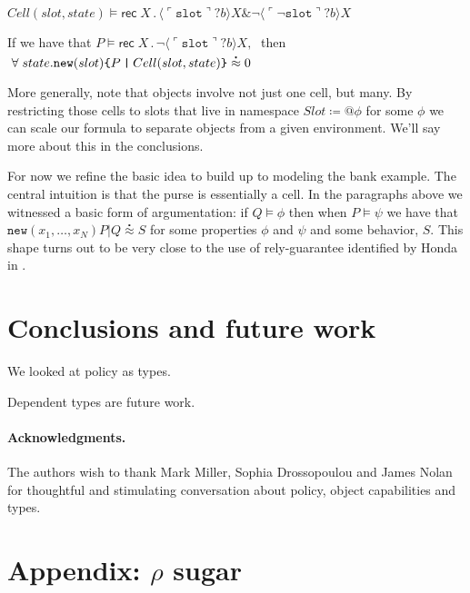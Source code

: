 \documentclass[]{amsart}
\newcommand{\lpquote}{\ulcorner}
\newcommand{\rpquote}{\urcorner}
\newcommand{\id}[1]{\texttt{#1}}
\newcommand{\juxtap}{\mathbin{\id{|}}}
\newcommand{\binpar}[2]{#1 \juxtap #2}
\newcommand{\defneqls}{\coloneqq}
\newcommand{\wbbisim}{\stackrel{\centerdot}{\approx}} %
\newcommand{\pquotep}[1]{\lpquote #1 \rpquote}
\newcommand{\pprefix}[3]{\langle #1 ? #2 \rangle #3}
\newcommand{\pgfp}[2]{\textsf{rec} \; #1 \mathbin{.} #2}
\theoremstyle{definition}
\theoremstyle{remark}
\numberwithin{equation}{subsection}
\begin{document}
$Cell (slot, state) \models 
\pgfp{X}{\pprefix{\pquotep{\texttt{slot}}}{b}{X} \& 
\neg \pprefix{\pquotep{\neg \texttt{slot}}}{b}{X}}$

If we have that $P \models \pgfp{X}{\neg
  \pprefix{\pquotep{\texttt{slot}}}{b}{X}}, \;$ then
$\; \forall \; state . \mbox{\tt new}(slot)\mbox{\tt \{}
\binpar{P}{Cell(slot, state)} \mbox{\tt \}}\wbbisim 0$

More generally, note that objects involve not just one cell, but
many. By restricting those cells to slots that live in namespace $Slot
\defneqls {@}\phi$ for some $\phi$ we can scale our formula to
separate objects from a given environment. We'll say more about this
in the conclusions. 

For now we refine the basic idea to build up to modeling the bank
example. The central intuition is that the purse is essentially a
cell. In the paragraphs above we witnessed a basic form of argumentation: if $Q
\models \phi$ then when $P \models \psi$ we have that
$\texttt{new}(x_1,\ldots,x_N)\binpar{P}{Q} \wbbisim S$ for some properties
$\phi$ and $\psi$ and some behavior, $S$. This shape turns out to be
very close to the use of rely-guarantee identified by Honda in
\cite{Honda:2008:UTP:2227536.2227558}.

\section{Conclusions and future work}

We looked at policy as types.

Dependent types are future work.

\paragraph{Acknowledgments.}
The authors wish to thank Mark Miller, Sophia Drossopoulou and James Nolan for
thoughtful and stimulating conversation about policy, object
capabilities and types.





\section{Appendix: $\rho$ sugar}
\end{document}
